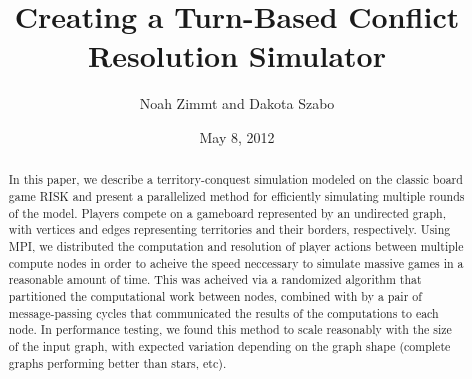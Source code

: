 \documentclass[10pt]{article}
\title{
	\textbf{
		Creating a Turn-Based Conflict Resolution Simulator
	}
}
\author{Noah Zimmt and Dakota Szabo}
\date{May 8, 2012}
\begin{document}
	\maketitle
	\begin{abstract}
		In this paper, we describe a territory-conquest simulation modeled on the classic board game RISK and present a parallelized method for efficiently simulating multiple rounds of the model. 
		Players compete on a gameboard represented by an undirected graph, with vertices and edges representing territories and their borders, respectively. 
		Using MPI, we distributed the computation and resolution of player actions between multiple compute nodes in order to acheive the speed neccessary to simulate massive games in a reasonable amount of time. 
		This was acheived via a randomized algorithm that partitioned the computational work between nodes, combined with by a pair of message-passing cycles that communicated the results of the computations to each node. 
		In performance testing, we found this method to scale reasonably with the size of the input graph, with expected variation depending on the graph shape (complete graphs performing better than stars, etc).
	\end{abstract}
\end{document}
